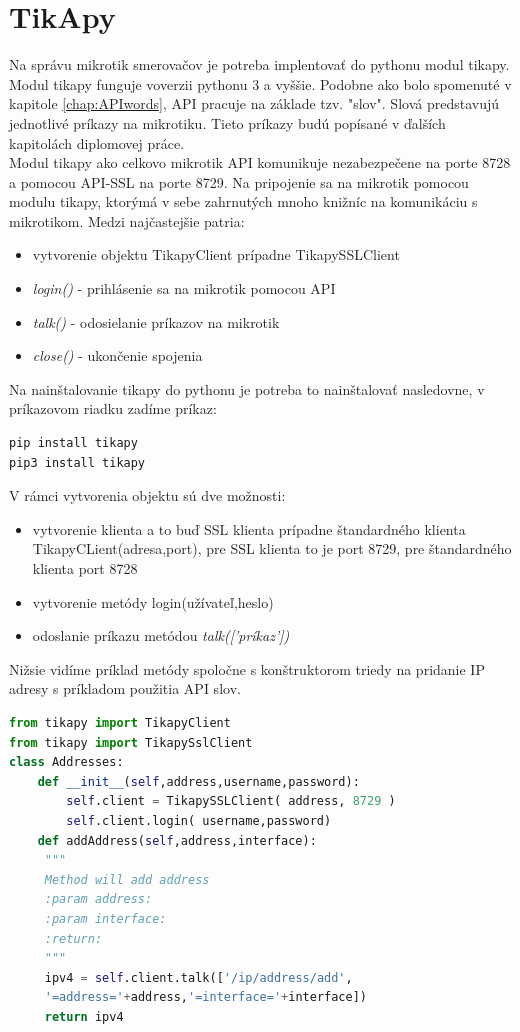 \section{TikApy}
\label{sec:tikapy}
Na správu mikrotik smerovačov je potreba implentovať do pythonu modul tikapy\cite{tikapy}. Modul tikapy funguje voverzii pythonu 3 a vyššie. Podobne ako bolo spomenuté v kapitole \ref{chap:APIwords}, API pracuje na základe tzv. "slov". Slová predstavujú jednotlivé príkazy na mikrotiku. Tieto príkazy budú popísané v ďalších kapitolách diplomovej práce.\\
Modul tikapy ako celkovo mikrotik API komunikuje nezabezpečene na porte 8728 a pomocou API-SSL na porte 8729. Na pripojenie sa na mikrotik pomocou modulu tikapy, ktorýmá v sebe zahrnutých mnoho knižníc na komunikáciu s mikrotikom. Medzi najčastejšie patria:\begin{itemize}
\item vytvorenie objektu TikapyClient prípadne TikapySSLClient
\item \textit{login()} - prihlásenie sa na mikrotik pomocou API
\item \textit{talk()} - odosielanie príkazov na mikrotik
\item  \textit{close()} - ukončenie spojenia
\end{itemize} 
Na nainštalovanie tikapy do pythonu je potreba to nainštalovať nasledovne, v príkazovom riadku zadíme príkaz:
\begin{lstlisting}[language=python, frame=single, caption=Inštalácia tikapy,  captionpos=b]
pip install tikapy
pip3 install tikapy
\end{lstlisting}
V rámci vytvorenia objektu sú dve možnosti:\begin{itemize}
\item vytvorenie klienta a to buď SSL klienta prípadne štandardného klienta TikapyCLient(adresa,port), pre SSL klienta to je port 8729, pre štandardného klienta port 8728
\item vytvorenie metódy login(užívateľ,heslo)
\item odoslanie príkazu metódou \textit{talk(['príkaz'])} 
\end{itemize}
Nižsie vidíme príklad metódy spoločne s konštruktorom triedy na pridanie IP adresy s príkladom použitia API slov.

\begin{lstlisting}[language=python, frame=single, caption=Príklad použitia tikapy,  captionpos=b]
from tikapy import TikapyClient
from tikapy import TikapySslClient
class Addresses:
    def __init__(self,address,username,password):
        self.client = TikapySSLClient( address, 8729 )
        self.client.login( username,password)
    def addAddress(self,address,interface):
     """
     Method will add address
     :param address:
     :param interface:
     :return:
     """
     ipv4 = self.client.talk(['/ip/address/add',
     '=address='+address,'=interface='+interface])
     return ipv4
\end{lstlisting} 





